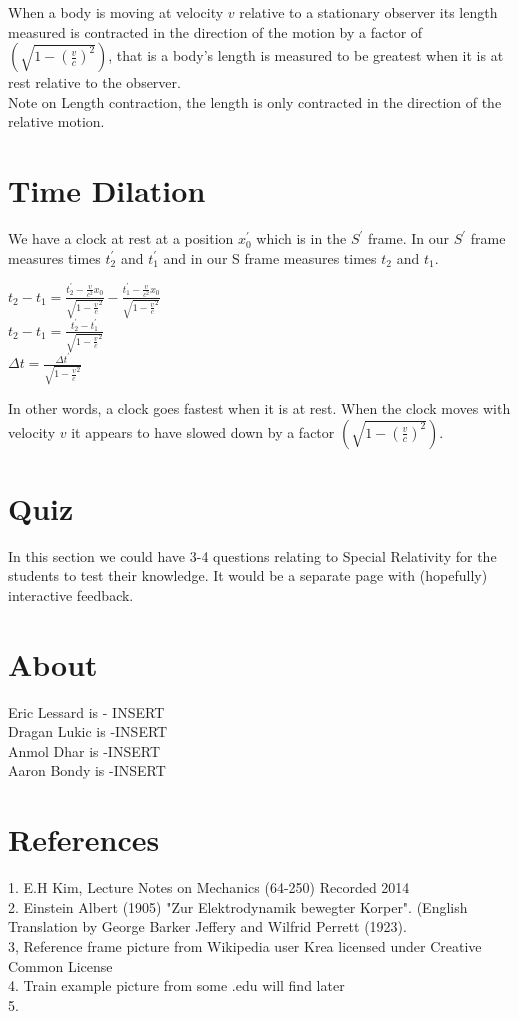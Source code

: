 \documentclass[a4paper]{article}
\begin{document}
When a body is moving at velocity $v$ relative to a stationary observer its length measured is contracted in the direction of the motion by a factor of $(\sqrt{1-(\frac{v}{c})^2})$, that is a body's length is measured to be greatest when it is at rest relative to the observer. \\
Note on Length contraction, the length is only contracted in the direction of the relative motion.

\section{Time Dilation}
We have a clock at rest at a position $x^\prime_0$ which is in the $S^\prime$ frame. In our $S^\prime$ frame measures times $t^\prime_2$ and $t^\prime_1$ and in our S frame measures times $t_2$ and $t_1$.\\
\begin{center}
$t_2 - t_1 = \frac{t^\prime_2 - \frac{v}{c^2}x_0}{\sqrt{1-\frac{v}{c}^2}} - \frac{t^\prime_1 - \frac{v}{c^2}x_0}{\sqrt{1-\frac{v}{c}^2}}$\\
$t_2 - t_1 = \frac{t^\prime_2 - t^\prime_1}{\sqrt{1-\frac{v}{c}^2}}$\\
$\Delta t = \frac{\Delta t^\prime}{\sqrt{1-\frac{v}{c}^2}}$\\
\end{center}
In other words, a clock goes fastest when it is at rest. When the clock moves with velocity $v$ it appears to have slowed down by a factor $(\sqrt{1-(\frac{v}{c})^2})$.

\section{Quiz}
In this section we could have 3-4 questions relating to Special Relativity for the students to test their knowledge. It would be a separate page with (hopefully) interactive feedback.

\section{About}
Eric Lessard is - INSERT\\
Dragan Lukic is -INSERT\\
Anmol Dhar is -INSERT\\
Aaron Bondy is -INSERT\\

\section{References}
1. E.H Kim, Lecture Notes on Mechanics (64-250) Recorded 2014\\
2. Einstein Albert (1905) "Zur Elektrodynamik bewegter Korper". (English Translation by George Barker Jeffery and Wilfrid Perrett (1923).\\
3, Reference frame picture from Wikipedia user Krea licensed under Creative Common License\\
4. Train example picture from some .edu will find later\\
5.
\end{document}
